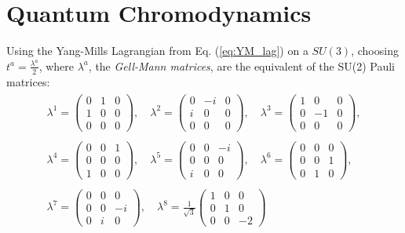 \documentclass[12pt, a4paper]{book}
\begin{document}
\section{Quantum Chromodynamics}
Using the Yang-Mills Lagrangian from Eq. (\ref{eq:YM_lag}) on a $SU(3)$, choosing $t^a =\frac{\lambda^a}{2}$, where $\lambda^a$, the \textit{Gell-Mann matrices}, are the equivalent of the SU(2) Pauli matrices:
\begin{align}\label{eq:Gell-Mann}
    \begin{split}
        \lambda ^{1}={\begin{pmatrix}0&1&0\\1&0&0\\0&0&0\end{pmatrix}},\quad 
        \lambda ^{2}={\begin{pmatrix}0&-i&0\\i&0&0\\0&0&0\end{pmatrix}},\quad 
        \lambda ^{3}={\begin{pmatrix}1&0&0\\0&-1&0\\0&0&0\end{pmatrix}}, \\\\
        \lambda ^{4}={\begin{pmatrix}0&0&1\\0&0&0\\1&0&0\end{pmatrix}},\quad 
        \lambda ^{5}={\begin{pmatrix}0&0&-i\\0&0&0\\i&0&0\end{pmatrix}},\quad 
        \lambda ^{6}={\begin{pmatrix}0&0&0\\0&0&1\\0&1&0\end{pmatrix}}, \\\\
        \lambda ^{7}={\begin{pmatrix}0&0&0\\0&0&-i\\0&i&0\end{pmatrix}},\quad 
        \lambda ^{8}={\frac {1}{\sqrt {3}}}{\begin{pmatrix}1&0&0\\0&1&0\\0&0&-2\end{pmatrix}}
    \end{split}
\end{align} 
\end{document}
